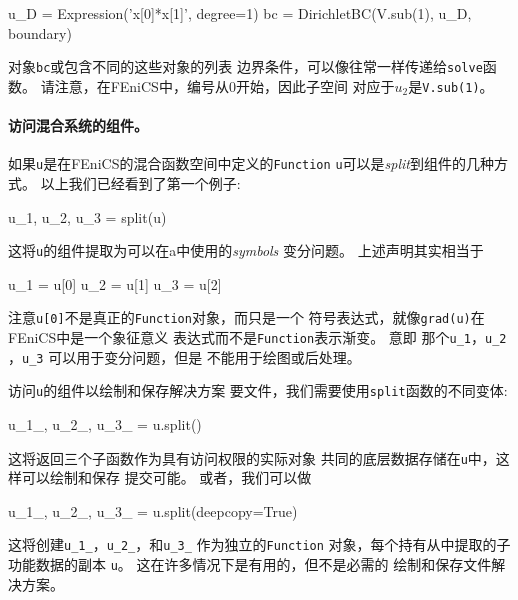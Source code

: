 \begin{python}
u_D = Expression('x[0]*x[1]', degree=1)
bc = DirichletBC(V.sub(1), u_D, boundary)
\end{python}
对象\texttt{bc}或包含不同的这些对象的列表
边界条件，可以像往常一样传递给\texttt{solve}函数。
请注意，在FEniCS中，编号从$0$开始，因此子空间
对应于$u_2$是\texttt{V.sub(1)}。

\paragraph{访问混合系统的组件。}

如果\texttt{u}是在FEniCS的混合函数空间中定义的\texttt{Function}
\texttt{u}可以是\emph{split}到组件的几种方式。
以上我们已经看到了第一个例子:

\begin{python}
u_1, u_2, u_3 = split(u)
\end{python}
这将\texttt{u}的组件提取为可以在a中使用的\emph{symbols}
变分问题。 上述声明其实相当于

\begin{python}
u_1 = u[0]
u_2 = u[1]
u_3 = u[2]
\end{python}
注意\texttt{u[0]}不是真正的\texttt{Function}对象，而只是一个
符号表达式，就像\texttt{grad(u)}在FEniCS中是一个象征意义
表达式而不是\texttt{Function}表示渐变。 意即
那个\verb!u_1!，\verb!u_2 !，\verb!u_3! 可以用于变分问题，但是
不能用于绘图或后处理。

访问\texttt{u}的组件以绘制和保存解决方案
要文件，我们需要使用\texttt{split}函数的不同变体:

\begin{python}
u_1_, u_2_, u_3_ = u.split()
\end{python}
这将返回三个子函数作为具有访问权限的实际对象
共同的底层数据存储在\texttt{u}中，这样可以绘制和保存
提交可能。 或者，我们可以做


\begin{python}
u_1_, u_2_, u_3_ = u.split(deepcopy=True)
\end{python}
这将创建\verb!u_1_!，\verb!u_2_!，和\verb!u_3_! 作为独立的\texttt{Function}
对象，每个持有从中提取的子功能数据的副本
\texttt{u}。 这在许多情况下是有用的，但不是必需的
绘制和保存文件解决方案。
